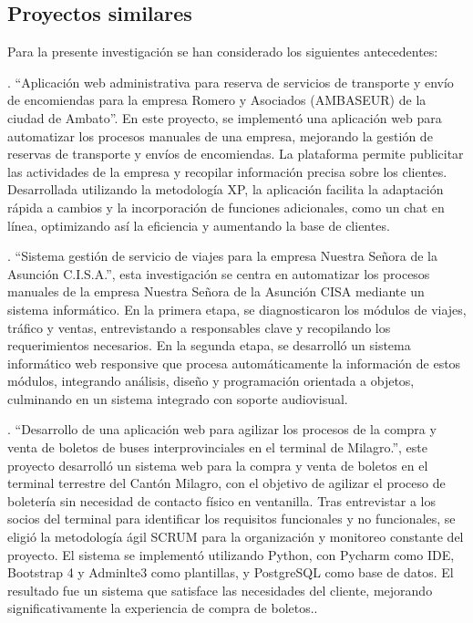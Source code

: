 	\subsection{Proyectos similares}
	
	Para la presente investigación se han considerado los siguientes antecedentes:
	
	\textcite{hurtado2019aplicacion}. ``Aplicación web administrativa para reserva de servicios de transporte y envío de encomiendas para la empresa Romero y Asociados (AMBASEUR) de la ciudad de Ambato''. En este proyecto, se implementó una aplicación web para automatizar los procesos manuales de una empresa, mejorando la gestión de reservas de transporte y envíos de encomiendas. La plataforma permite publicitar las actividades de la empresa y recopilar información precisa sobre los clientes. Desarrollada utilizando la metodología XP, la aplicación facilita la adaptación rápida a cambios y la incorporación de funciones adicionales, como un chat en línea, optimizando así la eficiencia y aumentando la base de clientes.
	
	\textcite{mora2022sistema}. ``Sistema gestión de servicio de viajes para la empresa Nuestra Señora de la Asunción C.I.S.A.'', esta investigación se centra en automatizar los procesos manuales de la empresa Nuestra Señora de la Asunción CISA mediante un sistema informático. En la primera etapa, se diagnosticaron los módulos de viajes, tráfico y ventas, entrevistando a responsables clave y recopilando los requerimientos necesarios. En la segunda etapa, se desarrolló un sistema informático web responsive que procesa automáticamente la información de estos módulos, integrando análisis, diseño y programación orientada a objetos, culminando en un sistema integrado con soporte audiovisual.
	
	\textcite{arevalo2021desarrollo}. ``Desarrollo de una aplicación web para
	agilizar los procesos de la compra y venta de boletos de buses interprovinciales en el terminal de Milagro.'', este proyecto desarrolló un sistema web para la compra y venta de boletos en el terminal terrestre del Cantón Milagro, con el objetivo de agilizar el proceso de boletería sin necesidad de contacto físico en ventanilla. Tras entrevistar a los socios del terminal para identificar los requisitos funcionales y no funcionales, se eligió la metodología ágil SCRUM para la organización y monitoreo constante del proyecto. El sistema se implementó utilizando Python, con Pycharm como IDE, Bootstrap 4 y Adminlte3 como plantillas, y PostgreSQL como base de datos. El resultado fue un sistema que satisface las necesidades del cliente, mejorando significativamente la experiencia de compra de boletos..
	
